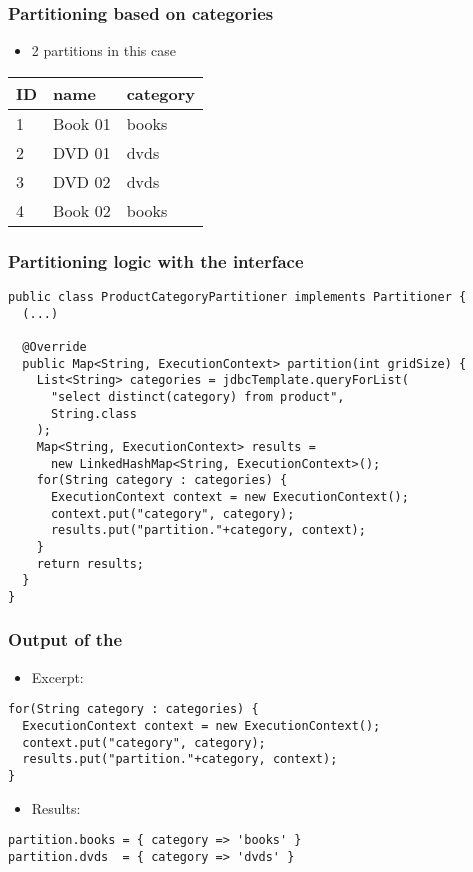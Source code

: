 \begin{frame}
 \frametitle{Partitioning based on categories}
 \begin{itemize}
  \item 2 partitions in this case  
 \end{itemize}
 \begin{center}
 \begin{tabular}{l|l|l}
  \hline
  ID & name & category \\
  \hline
  \rowcolor{cyan}1 & Book 01 & books \\
  \rowcolor{yellow}2 & DVD 01 & dvds \\
  \rowcolor{yellow}3 & DVD 02 & dvds \\
  \rowcolor{cyan}4 & Book 02 & books \\
  \hline
 \end{tabular}
 \end{center}
\end{frame}


\begin{frame}[fragile]
\frametitle{Partitioning logic with the  interface}
\lstset{language=Java}
\begin{lstlisting}
public class ProductCategoryPartitioner implements Partitioner {
  (...)

  @Override
  public Map<String, ExecutionContext> partition(int gridSize) {
    List<String> categories = jdbcTemplate.queryForList(
      "select distinct(category) from product",
      String.class
    );
    Map<String, ExecutionContext> results = 
      new LinkedHashMap<String, ExecutionContext>();
    for(String category : categories) {
      ExecutionContext context = new ExecutionContext();
      context.put("category", category);
      results.put("partition."+category, context);
    } 
    return results;
  }
}
\end{lstlisting}

\end{frame}

\begin{frame}[fragile]
\frametitle{Output of the }

\begin{itemize}
 \item Excerpt: 
\end{itemize}

\lstset{language=Java}
\begin{lstlisting}
for(String category : categories) {
  ExecutionContext context = new ExecutionContext();
  context.put("category", category);
  results.put("partition."+category, context);
}
\end{lstlisting}
\begin{itemize}
 \item Results: 
\end{itemize}

\begin{lstlisting}
partition.books = { category => 'books' }
partition.dvds  = { category => 'dvds' }
\end{lstlisting}

\end{frame}

